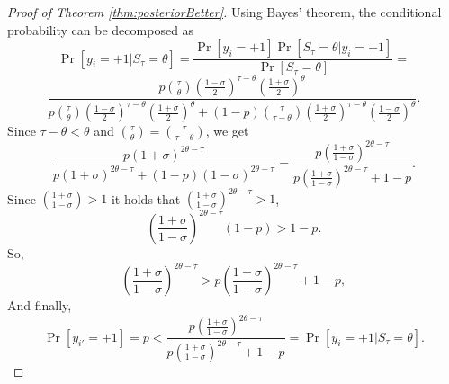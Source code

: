 \begin{proof}[Proof of Theorem \ref{thm:posteriorBetter}]

Using Bayes' theorem, the conditional probability can be decomposed as
\[
\Pr[y_i=+1|S_{\tau}=\theta]=\frac{\Pr[y_i=+1]\Pr[S_{\tau}=\theta|y_i=+1]}{\Pr[S_{\tau}=\theta]}=\]
\[
\frac{  p{\tau \choose \theta}(\frac{1-\sigma}{2})^{\tau-\theta}(\frac{1+\sigma}{2})^\theta}
{ p{\tau \choose \theta}(\frac{1-\sigma}{2})^{\tau-\theta}(\frac{1+\sigma}{2})^\theta+
 (1-p){\tau \choose \tau-\theta}(\frac{1+\sigma}{2})^{\tau-\theta}(\frac{1-\sigma}{2})^\theta}.
 \]
 Since $\tau-\theta<\theta$ and ${\tau \choose \theta}={\tau \choose \tau-\theta}$, we get
 \[
\frac{p(1+\sigma)^{2\theta-\tau}}
{ p(1+\sigma)^{2\theta-\tau}+
(1-p)(1-\sigma)^{2\theta-\tau}}=
\frac{p(\frac{1+\sigma}{1-\sigma})^{2\theta-\tau}}
{ p(\frac{1+\sigma}{1-\sigma})^{2\theta-\tau}+
1-p}.
\]
Since $(\frac{1+\sigma}{1-\sigma})>1$ it holds that $(\frac{1+\sigma}{1-\sigma})^{2\theta-\tau}>1$, 
\[
(\frac{1+\sigma}{1-\sigma})^{2\theta-\tau}(1-p)>
1-p.
\]
So,
\[
(\frac{1+\sigma}{1-\sigma})^{2\theta-\tau}>p(\frac{1+\sigma}{1-\sigma})^{2\theta-\tau}+
1-p,
\]
And finally,
\[
\Pr[y_{i'}=+1]=p<\frac{p(\frac{1+\sigma}{1-\sigma})^{2\theta-\tau}}
{ p(\frac{1+\sigma}{1-\sigma})^{2\theta-\tau}+
1-p}=\Pr[y_i=+1|S_{\tau}=\theta].
\]
\end{proof}

